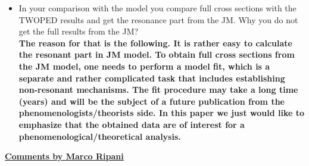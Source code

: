 \documentclass[,superscriptaddress,showpacs,amssymb,amsmath,amsfonts,linenumbers,article]{revtex4-1}
\begin{document}
\begin{itemize}
\item In your comparison with the model you compare full cross sections with the TWOPED results and get the resonance part from the JM. Why you do not get the full results from the JM?\\
{\bf The reason for that is the following. It is rather easy to calculate the resonant part in JM model. To obtain full cross sections from the JM model, one needs to perform a model fit, which is a separate and rather complicated task that includes establishing non-resonant mechanisms. The fit procedure may take a long time (years) and will be the subject of a future publication from the phenomenologists/theorists side. In this paper we just would like to emphasize that the obtained data are of interest for a phenomenological/theoretical analysis.  
}


\end{itemize}





\vspace{1cm}
\underline{\bf Comments by Marco Ripani}\\[1cm]
\end{document}
